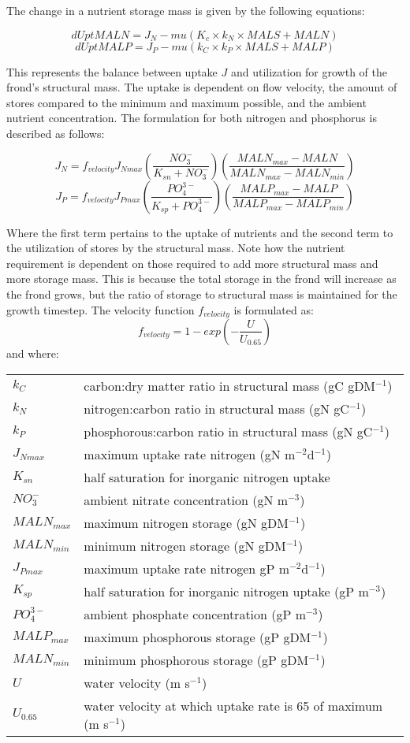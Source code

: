 \documentclass{deltares_manual}
\begin{document}
The change in a nutrient storage mass is given by the following equations:

\[dUptMALN = J_N - mu(K_c \times k_N \times MALS + MALN)\]
\[dUptMALP = J_P - mu(k_C \times k_P \times MALS + MALP)\]

This represents the balance between uptake $J$ and utilization for growth of the frond's structural mass. The uptake is dependent on flow velocity, the amount of stores compared to the minimum and maximum possible, and the ambient nutrient concentration. The formulation for both nitrogen and phosphorus is described as follows:

\[J_N = f_{velocity}J_{Nmax}(\frac{NO_3^-}{K_{sn}+NO_3^-})(\frac{MALN_{max}-MALN}{MALN_{max}-MALN_{min}})\]
\[J_P = f_{velocity}J_{Pmax}(\frac{PO_4^{3-}}{K_{sp}+PO_4^{3-}})(\frac{MALP_{max}-MALP}{MALP_{max}-MALP_{min}})\]

Where the first term pertains to the uptake of nutrients and the second term to the utilization of stores by the structural mass. Note how the nutrient requirement is dependent on those required to add more structural mass and more storage mass. This is because the total storage in the frond will increase as the frond grows, but the ratio of storage to structural mass is maintained for the growth timestep. The velocity function $f_{velocity}$ is formulated as:
\[f_{velocity} = 1-exp(-\frac{U}{U_{0.65}})\]
and where:\\
\begin{tabular}{ll}
$k_C$        & carbon:dry matter ratio in structural mass (gC gDM$^{-1}$)\\
$k_N$        & nitrogen:carbon ratio in structural mass (gN gC$^{-1}$)\\
$k_P$        & phosphorous:carbon ratio in structural mass (gN gC$^{-1}$)\\
$J_{Nmax}$   & maximum uptake rate nitrogen (gN m$^{-2}$d$^{-1}$)\\
$K_{sn}$     & half saturation for inorganic nitrogen uptake\\
$NO_3^-$     & ambient nitrate concentration (gN m$^{-3}$)\\
$MALN_{max}$ & maximum nitrogen storage (gN gDM$^{-1}$)\\
$MALN_{min}$ & minimum nitrogen storage (gN gDM$^{-1}$)\\
$J_{Pmax}$   & maximum uptake rate nitrogen gP m$^{-2}$d$^{-1}$)\\
$K_{sp}$     & half saturation for inorganic nitrogen uptake (gP m$^{-3}$)\\
$PO_4^{3-}$  & ambient phosphate concentration (gP m$^{-3}$)\\
$MALP_{max}$ & maximum phosphorous storage (gP gDM$^{-1}$)\\
$MALN_{min}$ & minimum phosphorous storage (gP gDM$^{-1}$)\\
$U$          & water velocity (m s$^{-1}$)\\
$U_{0.65}$   & water velocity at which uptake rate is 65 of maximum (m s$^{-1}$)\\
\end{tabular}
\end{document}
